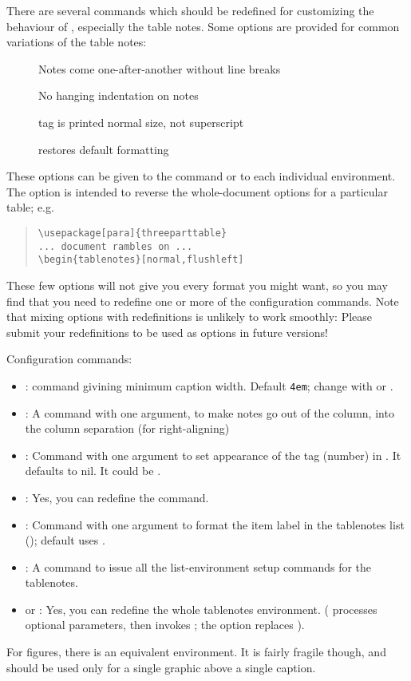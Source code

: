 \documentclass[a4paper]{article}
\begin{document}
There are several commands which should be redefined for customizing the
behaviour of , especially the table notes.
Some options are provided for common variations of the table notes:
\begin{description}
\item[]      Notes come one-after-another without line breaks
\item[] No hanging indentation on notes
\item[]     tag is printed normal size, not superscript
\item[]    restores default formatting
\end{description}
These options can be given to the  command or to each
individual  environment.  The
\option[normal] option is intended to reverse the whole-document
options for a particular table; e.g.
\begin{quote}
\begin{verbatim}
\usepackage[para]{threeparttable}
... document rambles on ...
\begin{tablenotes}[normal,flushleft]
\end{verbatim}
\end{quote}
These few options will not give you every format you might want, so
you may find that you need to redefine one or more of the
configuration commands.  Note that mixing options with redefinitions
is unlikely to work smoothly: Please submit your redefinitions to be
used as options in future versions!

Configuration commands:
\begin{itemize}
\item {}: command givining minimum caption width.
  Default \texttt{4em}; change with  or .
\item {}: A command with one argument, to make notes go out
  of the column, into the column separation (for right-aligning)
\item {}: Command with one argument to set appearance of
  the tag (number) in .  It defaults to nil.  It
  could be .
\item {}: Yes, you can redefine the  command.
\item {}: Command with one argument to format the item
  label in the tablenotes list (); default uses
  .
\item {}: A command to issue all the
  list-environment setup commands for the tablenotes.
\item {} or : Yes, you can redefine
  the whole tablenotes environment. ( processes
  optional parameters, then invokes ; the
  \option[para] option replaces ).
\end{itemize}
For figures, there is an equivalent 
environment. It is fairly fragile though, and should be used only for
a single graphic above a single caption.
\end{document}
